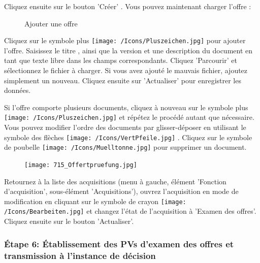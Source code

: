 Cliquez ensuite sur le bouton 'Créer' . Vous pouvez maintenant charger
l'offre :

\begin{figure}[H]
\caption{Ajouter une offre}
\end{figure}

Cliquez sur le symbole plus \texttt{[image: /Icons/Pluszeichen.jpg]}  pour ajouter l'offre. Saisissez le titre , ainsi que la version  et une description  du document en tant que texte libre dans les champs correspondants. Cliquez 'Parcourir'  et sélectionnez le fichier à charger. Si vous avez ajouté le mauvais fichier, ajoutez simplement un nouveau. Cliquez ensuite sur 'Actualiser'  pour enregistrer les données.

\vspace{\baselineskip}

Si l'offre comporte plusieurs documents, cliquez à nouveau sur le symbole plus \texttt{[image: /Icons/Pluszeichen.jpg]}  et répétez le procédé autant que nécessaire. Vous pouvez modifier l'ordre des documents par glisser-déposer en utilisant le symbole des flèches \texttt{[image: /Icons/VertPfeile.jpg]} . Cliquez sur le symbole de poubelle \texttt{[image: /Icons/Muelltonne.jpg]}  pour supprimer un document.

\vspace{\baselineskip}

\begin{figure}
\vspace{-15pt}
\texttt{[image: 715\_Offertpruefung.jpg]}
\end{figure}
Retournez à la liste des acquisitions (menu à gauche, élément 'Fonction d'acquisition', sous-élément 'Acquisitions'), ouvrez l'acquisition en mode de modification en cliquant sur le symbole de crayon \texttt{[image: /Icons/Bearbeiten.jpg]} et changez l'état de l'acquisition à 'Examen des offres'. Cliquez ensuite sur le bouton 'Actualiser'.

\vspace{\baselineskip}

\pagebreak
\subsubsection{Étape 6: Établissement des PVs d'examen des offres et transmission à l'instance de décision}

